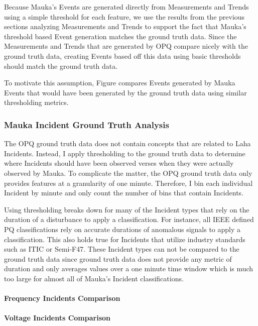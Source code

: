 Because Mauka's Events are generated directly from Measurements and Trends using a simple threshold for each feature, we use the results from the previous sections analyzing Measurements and Trends to support the fact that Mauka's threshold based Event generation matches the ground truth data. Since the Measurements and Trends that are generated by OPQ compare nicely with the ground truth data, creating Events based off this data using basic thresholds should match the ground truth data.

To motivate this assumption, Figure compares Events generated by Mauka Events that would have been generated by the ground truth data using similar thresholding metrics.

\subsubsection{Mauka Incident Ground Truth Analysis}

The OPQ ground truth data does not contain concepts that are related to Laha Incidents. Instead, I apply thresholding to the ground truth data to determine where Incidents should have been observed verses when they were actually observed by Mauka. To complicate the matter, the OPQ ground truth data only provides features at a granularity of one minute. Therefore, I bin each individual Incident by minute and only count the number of bins that contain Incidents.

Using thresholding breaks down for many of the Incident types that rely on the duration of a disturbance to apply a classification. For instance, all IEEE defined PQ classifications rely on accurate durations of anomalous signals to apply a classification. This also holds true for Incidents that utilize industry standards such as ITIC or Semi-F47. These Incident types can not be compared to the ground truth data since ground truth data does not provide any metric of duration and only averages values over a one minute time window which is much too large for almost all of Mauka's Incident classifications.

\paragraph{Frequency Incidents Comparison}

\paragraph{Voltage Incidents Comparison}

